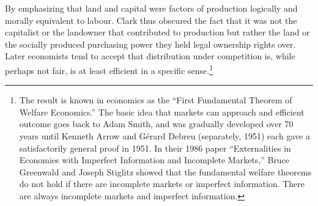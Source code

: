 
By emphasizing that land and capital were factors of production logically and morally equivalent to labour. Clark thus obscured the fact that it was not the capitalist or the landowner that contributed to production but rather  the land or the socially produced purchasing power they held legal ownership rights over. Later economists tend to accept that distribution under competition is, while perhaps not fair, is at least efficient in a specific sense.\footnote{The result is known  in economics as the ``First Fundamental Theorem of Welfare Economics.'' The basic idea that markets can approach and efficient outcome goes back to Adam Smith, and was gradually developed  over 70 years until Kenneth Arrow and Gérard Debreu (separately, 1951) each gave a satisfactorily general proof in 1951. In their 1986 paper ``Externalities in Economies with Imperfect Information and Incomplete Markets,''
Bruce Greenwald and Joseph Stiglitz showed that the fundamental welfare theorems do not hold if there are incomplete markets or imperfect information. There are always incomplete markets and  imperfect information.}%





